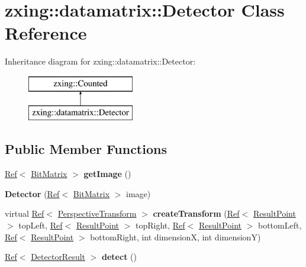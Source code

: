 \hypertarget{classzxing_1_1datamatrix_1_1_detector}{}\section{zxing\+:\+:datamatrix\+:\+:Detector Class Reference}
\label{classzxing_1_1datamatrix_1_1_detector}
Inheritance diagram for zxing\+:\+:datamatrix\+:\+:Detector\+:\begin{figure}[H]
\begin{center}
\leavevmode
\includegraphics[height=2.000000cm]{classzxing_1_1datamatrix_1_1_detector}
\end{center}
\end{figure}
\subsection*{Public Member Functions}
\begin{DoxyCompactItemize}
\item 
\mbox{\label{classzxing_1_1datamatrix_1_1_detector_a926b89981e9d45ab22ab913db40cd41b}} 
\mbox{\hyperlink{classzxing_1_1_ref}{Ref}}$<$ \mbox{\hyperlink{classzxing_1_1_bit_matrix}{Bit\+Matrix}} $>$ {\bfseries get\+Image} ()
\item 
\mbox{\label{classzxing_1_1datamatrix_1_1_detector_a7f9ae270b02b5417e29c86ef6a64dd90}} 
{\bfseries Detector} (\mbox{\hyperlink{classzxing_1_1_ref}{Ref}}$<$ \mbox{\hyperlink{classzxing_1_1_bit_matrix}{Bit\+Matrix}} $>$ image)
\item 
\mbox{\label{classzxing_1_1datamatrix_1_1_detector_aa0233f955fca1cf228c948c5ad347e51}} 
virtual \mbox{\hyperlink{classzxing_1_1_ref}{Ref}}$<$ \mbox{\hyperlink{classzxing_1_1_perspective_transform}{Perspective\+Transform}} $>$ {\bfseries create\+Transform} (\mbox{\hyperlink{classzxing_1_1_ref}{Ref}}$<$ \mbox{\hyperlink{classzxing_1_1_result_point}{Result\+Point}} $>$ top\+Left, \mbox{\hyperlink{classzxing_1_1_ref}{Ref}}$<$ \mbox{\hyperlink{classzxing_1_1_result_point}{Result\+Point}} $>$ top\+Right, \mbox{\hyperlink{classzxing_1_1_ref}{Ref}}$<$ \mbox{\hyperlink{classzxing_1_1_result_point}{Result\+Point}} $>$ bottom\+Left, \mbox{\hyperlink{classzxing_1_1_ref}{Ref}}$<$ \mbox{\hyperlink{classzxing_1_1_result_point}{Result\+Point}} $>$ bottom\+Right, int dimensionX, int dimensionY)
\item 
\mbox{\label{classzxing_1_1datamatrix_1_1_detector_a6e9b6f9018641f11dbc6c55f026c0618}} 
\mbox{\hyperlink{classzxing_1_1_ref}{Ref}}$<$ \mbox{\hyperlink{classzxing_1_1_detector_result}{Detector\+Result}} $>$ {\bfseries detect} ()
\end{DoxyCompactItemize}
